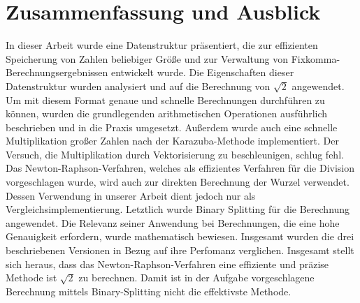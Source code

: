 \documentclass[course=erap]{aspdoc}
\begin{document}
\section{Zusammenfassung und Ausblick}
In dieser Arbeit wurde eine Datenstruktur präsentiert, die zur effizienten Speicherung von Zahlen beliebiger Größe und zur Verwaltung von Fixkomma- Berechnungsergebnissen entwickelt wurde. Die Eigenschaften dieser Datenstruktur wurden analysiert und auf die Berechnung von $\sqrt{2}$ angewendet. Um mit diesem Format genaue und schnelle Berechnungen durchführen zu können, wurden die grundlegenden arithmetischen Operationen ausführlich beschrieben und in die Praxis umgesetzt. Außerdem wurde auch eine schnelle Multiplikation großer Zahlen nach der Karazuba-Methode implementiert. Der Versuch, die Multiplikation durch Vektorisierung zu beschleunigen, schlug fehl. Das Newton-Raphson-Verfahren, welches als effizientes Verfahren für die Division vorgeschlagen wurde, wird auch zur direkten Berechnung der Wurzel verwendet. Dessen Verwendung in unserer Arbeit dient jedoch nur als Vergleichsimplementierung. Letztlich wurde Binary Splitting für die Berechnung angewendet. Die Relevanz seiner Anwendung bei Berechnungen, die eine hohe Genauigkeit erfordern, wurde mathematisch bewiesen. Insgesamt wurden die drei beschriebenen Versionen in Bezug auf ihre Perfomanz verglichen. Insgesamt stellt sich heraus, dass das Newton-Raphson-Verfahren  eine effiziente und präzise Methode ist $\sqrt{2}$ zu berechnen. Damit ist in der Aufgabe vorgeschlagene Berechnung mittels Binary-Splitting nicht die effektivste Methode. 


{}
\end{document}

